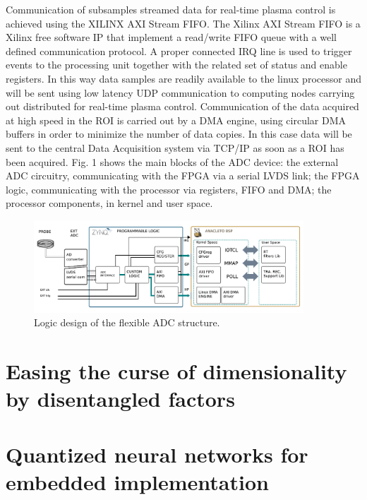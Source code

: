 Communication of subsamples streamed data for real-time plasma control is achieved using the XILINX AXI Stream FIFO. The Xilinx AXI Stream FIFO is a Xilinx free software IP that implement a read/write FIFO queue with a well defined communication protocol. A proper connected IRQ line is used to trigger events to the processing unit together with the related set of status and enable registers. In this way data samples are readily available to the linux processor and will be sent using low latency UDP communication to computing nodes carrying out distributed for real-time plasma control. Communication of the data acquired at high speed in the ROI is carried out by a DMA engine, using circular DMA buffers in order to minimize the number of data copies. In this case data will be sent to the central Data Acquisition system via TCP/IP as soon as a ROI has been acquired. Fig. 1 shows the main blocks of the ADC device: the external ADC circuitry, communicating with the FPGA via a serial LVDS link; the FPGA logic, communicating with the processor via registers, FIFO and DMA; the processor components, in kernel and user space. 
~
~
\begin{figure}[ht]
\centering
\includegraphics[width=0.9\textwidth]{img/4_EmbeddedML/schema_logico.pdf}
\caption{Logic design of the flexible ADC structure.}
\label{fig:logic}
\end{figure}




\section{Easing the curse of dimensionality by disentangled factors}





\section{Quantized neural networks for embedded implementation}

